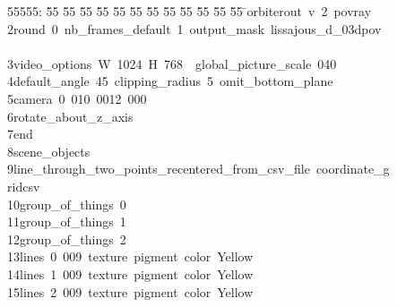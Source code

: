 %
%
\begin{tabbing}
55555: \= 55 \= 55 \= 55 \= 55 \= 55 \= 55 \= 55 \= 55 \= 55 \= 55 \= 55 \= 55 \= \>orbiterout\ v\ 2\ povray\ \\[0pt]
2\>\>round\ 0\ nb\_frames\_default\ 1\ output\_mask\ lissajous\_d\_03dpov\\[0pt]
\>\ \\[0pt]
3\>\>video\_options\ W\ 1024\ H\ 768\ \ global\_picture\_scale\ 040\ \\[0pt]
4\>\>default\_angle\ 45\ clipping\_radius\ 5\ omit\_bottom\_plane\ \ \\[0pt]
5\>\>camera\ 0\ 010\ 0012\ 000\ \ \\[0pt]
6\>\>rotate\_about\_z\_axis\ \\[0pt]
7\>\>end\ \\[0pt]
8\>\>scene\_objects\ \\[0pt]
9\>\>\>line\_through\_two\_points\_recentered\_from\_csv\_file\ coordinate\_g\\[0pt]
\>ridcsv\ \\[0pt]
10\>\>\>group\_of\_things\ 0\ \\[0pt]
11\>\>\>group\_of\_things\ 1\ \\[0pt]
12\>\>\>group\_of\_things\ 2\ \\[0pt]
13\>\>\>lines\ 0\ 009\ texture\ pigment\ color\ Yellow\ \ \ \\[0pt]
14\>\>\>lines\ 1\ 009\ texture\ pigment\ color\ Yellow\ \ \ \\[0pt]
15\>\>\>lines\ 2\ 009\ texture\ pigment\ color\ Yellow\ \ \ \\[0pt]

\end{tabbing}
